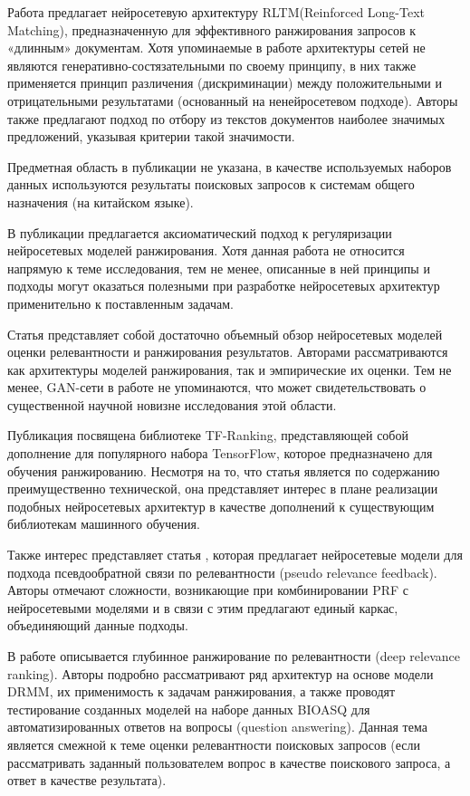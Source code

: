 Работа \cite{DBLP:journals/corr/abs-1906-09404} предлагает нейросетевую архитектуру RLTM(Reinforced Long-Text Matching), предназначенную для эффективного 
ранжирования запросов к «длинным» документам. Хотя упоминаемые в работе архитектуры сетей не являются генеративно-состязательными
по своему принципу, в них также применяется принцип различения (дискриминации) между положительными и отрицательными результатами
(основанный на ненейросетевом подходе). Авторы также предлагают подход по отбору из текстов документов наиболее значимых
предложений, указывая критерии такой значимости. 

Предметная область в публикации не указана, в качестве используемых наборов данных используются результаты поисковых запросов к
системам общего назначения (на китайском языке).

В публикации \cite{DBLP:journals/corr/abs-1904-06808} предлагается аксиоматический подход к регуляризации нейросетевых моделей 
ранжирования. Хотя данная работа не относится напрямую к теме исследования, тем не менее, описанные в ней принципы и подходы 
могут оказаться полезными при разработке нейросетевых архитектур применительно к поставленным задачам.

Статья \cite{DBLP:journals/corr/abs-1903-06902} представляет собой достаточно объемный обзор нейросетевых моделей оценки 
релевантности и ранжирования результатов. Авторами рассматриваются как архитектуры моделей ранжирования, так и эмпирические
их оценки. Тем не менее, GAN-сети в работе не упоминаются, что может свидетельствовать о существенной научной новизне
исследования этой области.

Публикация \cite{DBLP:journals/corr/abs-1812-00073} посвящена библиотеке TF-Ranking, представляющей собой дополнение для 
популярного набора TensorFlow, которое предназначено для обучения ранжированию. Несмотря на то, что статья является 
по содержанию преимущественно технической, она представляет интерес в плане реализации подобных нейросетевых архитектур 
в качестве дополнений к существующим библиотекам машинного обучения.

Также интерес представляет статья \cite{DBLP:journals/corr/abs-1810-12936}, которая предлагает нейросетевые модели 
для подхода псевдообратной связи по релевантности (pseudo relevance feedback). Авторы отмечают сложности, возникающие при
комбинировании PRF с нейросетевыми моделями и в связи с этим предлагают единый каркас, объединяющий данные подходы.

В работе \cite{DBLP:journals/corr/abs-1809-01682} описывается глубинное ранжирование по релевантности (deep relevance ranking).
Авторы подробно рассматривают ряд архитектур на основе модели DRMM, их применимость к задачам ранжирования, а также проводят
тестирование созданных моделей на наборе данных BIOASQ для автоматизированных ответов на вопросы (question answering).
Данная тема является смежной к теме оценки релевантности поисковых запросов (если рассматривать заданный пользователем
вопрос в качестве поискового запроса, а ответ в качестве результата).

